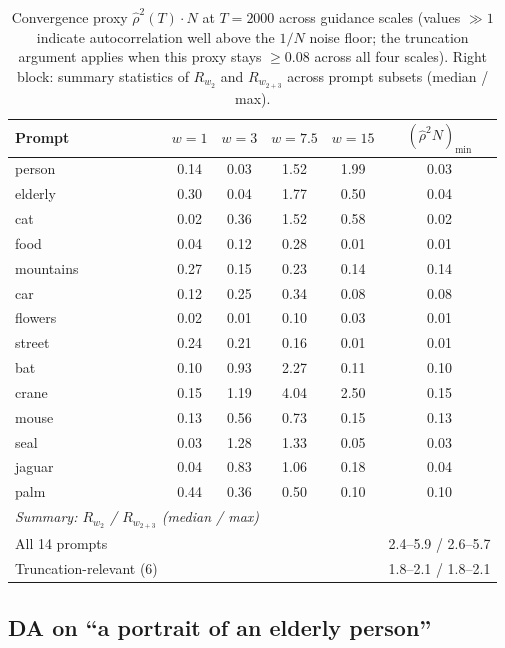 \documentclass{article}
\begin{document}
\begin{table}[H]
\centering
\caption{Convergence proxy $\hat\rho^2(T)\cdot N$ at $T{=}2000$ across guidance scales (values $\gg 1$ indicate autocorrelation well above the $1/N$ noise floor; the truncation argument applies when this proxy stays $\geq 0.08$ across all four scales). Right block: summary statistics of $R_{w_2}$ and $R_{w_{2+3}}$ across prompt subsets (median / max).}
\label{tab:weight_comparability_summary}
\setlength{\tabcolsep}{4pt}
\begin{tabular}{l|cccc|c}
\toprule
Prompt & $w{=}1$ & $w{=}3$ & $w{=}7.5$ & $w{=}15$ & $(\hat\rho^2 N)_{\min}$ \\
\midrule
person & 0.14 & 0.03 & 1.52 & 1.99 & 0.03 \\
elderly & 0.30 & 0.04 & 1.77 & 0.50 & 0.04 \\
cat & 0.02 & 0.36 & 1.52 & 0.58 & 0.02 \\
food & 0.04 & 0.12 & 0.28 & 0.01 & 0.01 \\
mountains & 0.27 & 0.15 & 0.23 & 0.14 & 0.14 \\
car & 0.12 & 0.25 & 0.34 & 0.08 & 0.08 \\
flowers & 0.02 & 0.01 & 0.10 & 0.03 & 0.01 \\
street & 0.24 & 0.21 & 0.16 & 0.01 & 0.01 \\
\midrule
bat & 0.10 & 0.93 & 2.27 & 0.11 & 0.10 \\
crane & 0.15 & 1.19 & 4.04 & 2.50 & 0.15 \\
mouse & 0.13 & 0.56 & 0.73 & 0.15 & 0.13 \\
seal & 0.03 & 1.28 & 1.33 & 0.05 & 0.03 \\
jaguar & 0.04 & 0.83 & 1.06 & 0.18 & 0.04 \\
palm & 0.44 & 0.36 & 0.50 & 0.10 & 0.10 \\
\midrule
\multicolumn{6}{l}{\textit{Summary: $R_{w_2}$ / $R_{w_{2+3}}$ (median / max)}} \\
All 14 prompts & \multicolumn{4}{r|}{} & 2.4--5.9 / 2.6--5.7 \\
Truncation-relevant (6) & \multicolumn{4}{r|}{} & 1.8--2.1 / 1.8--2.1 \\
\bottomrule
\end{tabular}
\end{table}

\subsection{DA on ``a portrait of an elderly person''}
\label{app:sdxl_elderly}
\end{document}
